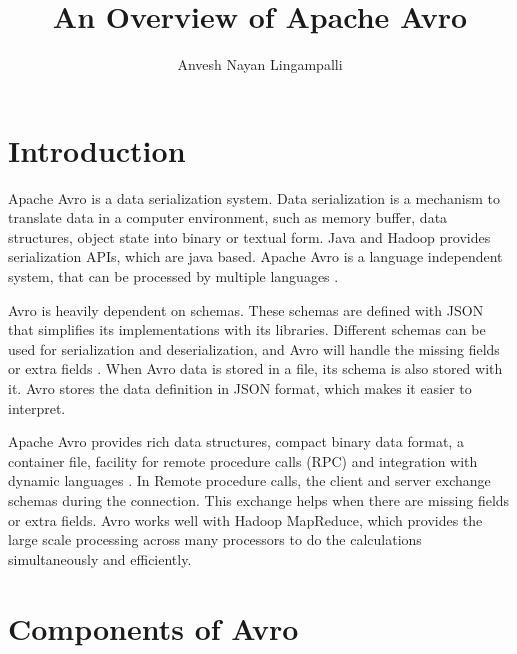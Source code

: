 \documentclass[9pt,twocolumn,twoside]{../../styles/osajnl}
\title{An Overview of Apache Avro}
\author[1]{Anvesh Nayan Lingampalli}
\affil[1]{School of Informatics and Computing, Bloomington, IN 47408, U.S.A.}
\affil[*]{Corresponding authors: anveling@umail.iu.edu}
\begin{document}
\maketitle



\section{Introduction} 

Apache Avro \cite{www-apache-avro} is a data serialization
system. Data serialization is a mechanism to translate data in a
computer environment, such as memory buffer, data structures, object
state into binary or textual form.  Java and Hadoop provides
serialization APIs, which are java based. Apache Avro is a language
independent system, that can be processed by multiple languages
\cite{www-doc-avro}.

Avro is heavily dependent on schemas. These schemas are defined with
JSON that simplifies its implementations with its libraries. Different
schemas can be used for serialization and deserialization, and Avro
will handle the missing fields or extra fields
\cite{www-tutorialspoint-avro}. When Avro data is stored in a file,
its schema is also stored with it. Avro stores the data definition in
JSON format, which makes it easier to interpret.

Apache Avro provides rich data structures, compact binary data format,
a container file, facility for remote procedure calls (RPC) and
integration with dynamic languages \cite{www-apache-avro}. In Remote
procedure calls, the client and server exchange schemas during the
connection. This exchange helps when there are missing fields or extra
fields. Avro works well with Hadoop MapReduce, which provides the
large scale processing across many processors to do the calculations
simultaneously and efficiently.

\section{Components of Avro}
\end{document}
